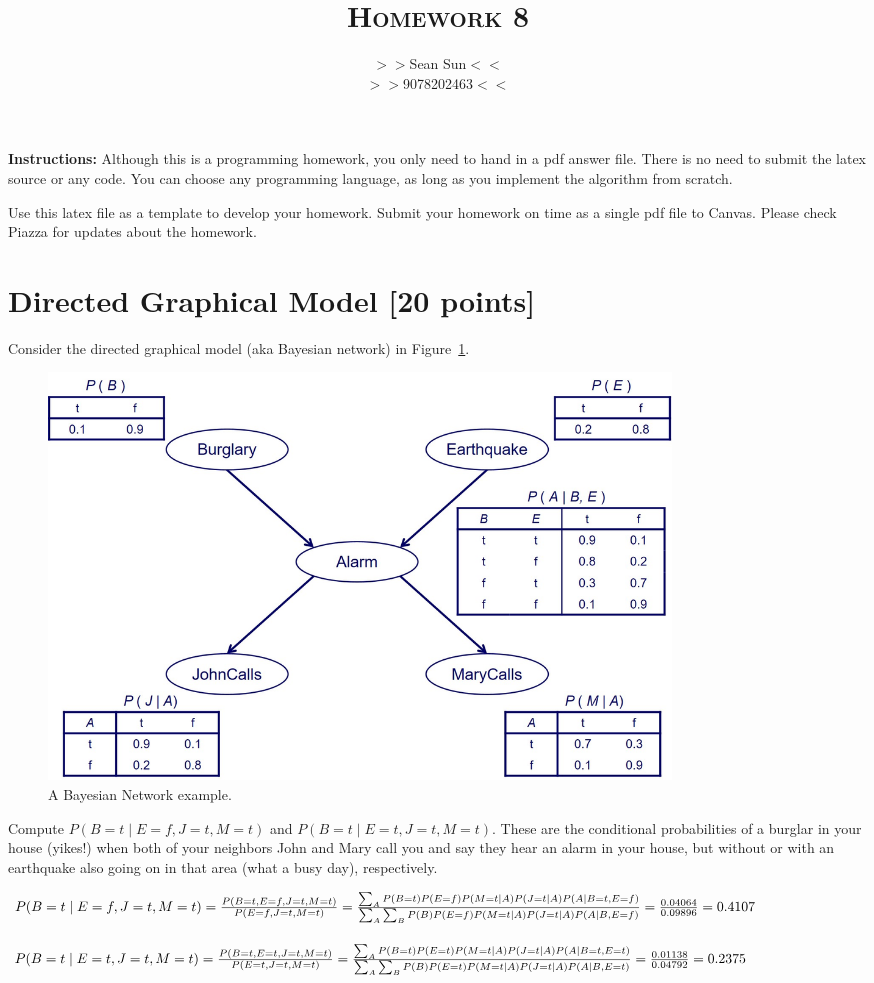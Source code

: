 \documentclass[a4paper]{article}
\title{\textsc{Homework 8}} %
\author{
$>>$Sean Sun$<<$ \\
$>>$9078202463$<<$\\
}
\date{}
\theoremstyle{definition}
\newenvironment{soln}{
    \leavevmode\color{blue}\ignorespaces
}{}
\begin{document}
\maketitle 


\textbf{Instructions:} 
Although this is a programming homework, you only need to hand in a pdf answer file.
There is no need to submit the latex source or any code.
You can choose any programming language, as long as you implement the algorithm from scratch.

Use this latex file as a template to develop your homework.
Submit your homework on time as a single pdf file to Canvas.
Please check Piazza for updates about the homework.


\section{Directed Graphical Model [20 points]}
Consider the directed graphical model (aka Bayesian network) in Figure~\ref{fig:bn}.
\begin{figure}[H]
        \centering
                \includegraphics[width=0.8\textwidth]{BN.jpg}
        \caption{A Bayesian Network example.}
        \label{fig:bn}
\end{figure}
Compute $P(B=t \mid E=f,J=t,M=t)$ and $P(B=t \mid E=t,J=t,M=t)$.
These are the conditional probabilities of a burglar in your house (yikes!) when both of your neighbors John and Mary call you and say they hear an alarm in your house, but without or with an earthquake also going on in that area (what a busy day), respectively.

\begin{soln}

$P(B=t \mid E=f,J=t,M=t)\\
 = \frac{P(B=t, E=f,J=t,M=t)}{P(E=f,J=t,M=t) }
 = 
\frac{\sum_A {P(B=t)P(E=f)P(M=t \mid A)P(J=t \mid A)P(A \mid B=t, E=f)}}
{\sum_A {\sum_B P(B)P(E=f)P(M=t \mid A)P(J=t \mid A)P(A \mid B, E=f)}}
= \frac{0.04064}{0.09896} 
\\= 0.4107 $\\\\
$P(B=t \mid E=t,J=t,M=t) 
\\= \frac{P(B=t, E=t,J=t,M=t)}{P(E=t,J=t,M=t)}
 = 
\frac{\sum_A {P(B=t)P(E=t)P(M=t \mid A)P(J=t \mid A)P(A \mid B=t, E=t)}}
{\sum_A {\sum_B P(B)P(E=t)P(M=t \mid A)P(J=t \mid A)P(A \mid B, E=t)}}= \frac{0.01138}{0.04792}
\\=0.2375
 $
\end{soln}
\end{document}
